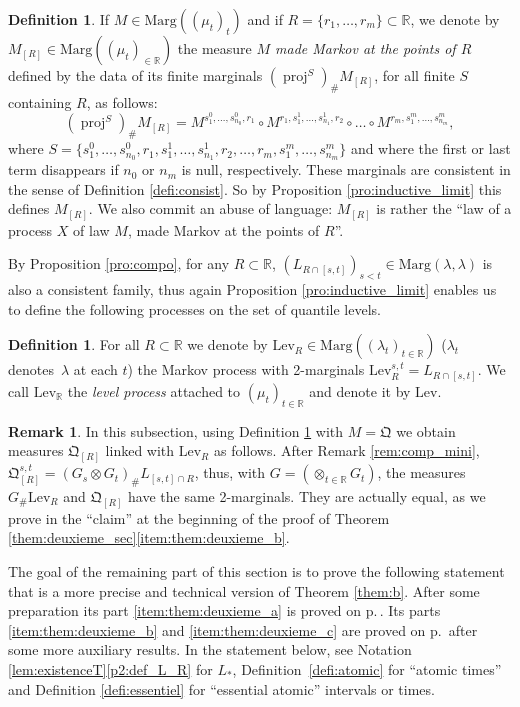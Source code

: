 \documentclass[JEP,XML,SOM,Unicode,NoEqCountersInSection,NoFloatCountersInSection,published]{cedram}
\theoremstyle{plain}
\theoremstyle{definition}
\newtheorem{defi}[them]{Definition}
\newtheorem{rem}[them]{Remark}
\newcommand{\como}{\mathfrak{Q}}
\newcommand{\lev}{\mathrm{Lev}}
\newcommand{\la}{\lambda}
\newcommand{\ma}{\mathrm{Marg}}
\newcommand{\R}{\mathbb{R}}
\newcommand{\pr}{\operatorname{proj}}
\begin{document}
\begin{defi}\label{defi:quantile_discretement_markovien} If $M\in\ma((\mu_t)_t)$ and if $R=\{r_1,\ldots,r_m\}\subset\R$, we denote by $M_{[R]}\in\ma((\mu_t)_{\in\R})$ the measure \emph{$M$ made Markov at the points of $R$} defined by the data of its finite marginals $(\pr^{S})_\# M_{[R]}$, for all finite $S$ containing $R$, as follows:
\[(\pr^{S})_\# M_{[R]}= M^{s^0_1,\ldots, s^0_{n_0},r_1}\circ M^{r_1,s^1_{1},\ldots,s^1_{n_1},r_2}\circ\ldots\circ M^{r_m,s^m_{1},\ldots,s^m_{n_m}},\]
where $S=\{s^0_1,\ldots, s^0_{n_0},r_1,s^1_{1},\ldots,s^1_{n_1},r_2,\ldots,r_m,s^m_{1},\ldots,s^m_{n_m}\}$ and where the first or last term disappears if $n_0$ or $n_m$ is null, respectively. These marginals are consistent in the sense of Definition \ref{defi:consist}. So by Proposition \ref{pro:inductive_limit} this defines $M_{[R]}$. We also commit an abuse of language: $M_{[R]}$ is rather the ``law of a process $X$ of law $M$, made Markov at the points of $R$''.
\end{defi}

By Proposition \ref{pro:compo}, for any $R\subset\R$, $(L_{R\cap[s,t]})_{s<t}\in \ma(\la,\la)$ is also a consistent family, thus again Proposition \ref{pro:inductive_limit} enables us to define the following processes on the set of quantile levels.

\begin{defi}\label{defi:lev}
For all $R\subset\R$ we denote by $\lev_R\in\ma((\la_t)_{t\in\R})$ ($\la_t$ denotes~$\la$ at each $t$) the Markov process with 2-marginals $\lev_R^{s,t}=L_{R\cap[s,t]}$. We call $\lev_\R$ the \emph{level process} attached to $(\mu_t)_{t\in \R}$ and denote it by $\lev$.
\end{defi}

\begin{rem}\label{rem:mini_et_Q}In this subsection, using Definition \ref{defi:quantile_discretement_markovien} with $M=\como$ we obtain measures $\como_{[R]}$ linked with $\lev_R$ as follows. After Remark \ref{rem:comp_mini}, $\como_{[R]}^{s,t}=(G_s\otimes G_t)_\#L_{[s,t]\cap R}$, thus, with $G=(\otimes_{t\in \R} G_{t})$, the measures $G_\#\lev_R$ and $\como_{[R]}$ have the same 2-marginals. They are actually equal, as we prove in the ``claim'' at the beginning of the proof of Theorem \ref{them:deuxieme_sec}\eqref{item:them:deuxieme_b}.
\end{rem}

The goal of the remaining part of this section is to prove the following statement that is a more precise and technical version of Theorem \ref{them:b}. After some preparation its part \eqref{item:them:deuxieme_a} is proved on p.\,\pageref{proof:themBa}. Its parts \eqref{item:them:deuxieme_b} and \eqref{item:them:deuxieme_c} are proved on p.\,\pageref{proof:them:deuxieme} after some more auxiliary results. In the statement below, see Notation \ref{lem:existenceT}\eqref{p2:def_L_R} for $L_\ast$, Definition~\ref{defi:atomic} for ``atomic times'' and Definition \ref{defi:essentiel} for ``essential atomic'' intervals or times.
\end{document}
